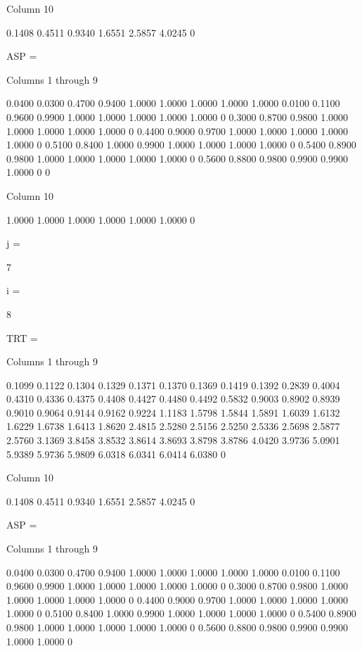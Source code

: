   Column 10

    0.1408
    0.4511
    0.9340
    1.6551
    2.5857
    4.0245
         0


ASP =

  Columns 1 through 9

    0.0400    0.0300    0.4700    0.9400    1.0000    1.0000    1.0000    1.0000    1.0000
    0.0100    0.1100    0.9600    0.9900    1.0000    1.0000    1.0000    1.0000    1.0000
         0    0.3000    0.8700    0.9800    1.0000    1.0000    1.0000    1.0000    1.0000
         0    0.4400    0.9000    0.9700    1.0000    1.0000    1.0000    1.0000    1.0000
         0    0.5100    0.8400    1.0000    0.9900    1.0000    1.0000    1.0000    1.0000
         0    0.5400    0.8900    0.9800    1.0000    1.0000    1.0000    1.0000    1.0000
         0    0.5600    0.8800    0.9800    0.9900    0.9900    1.0000         0         0

  Column 10

    1.0000
    1.0000
    1.0000
    1.0000
    1.0000
    1.0000
         0


j =

     7


i =

     8


TRT =

  Columns 1 through 9

    0.1099    0.1122    0.1304    0.1329    0.1371    0.1370    0.1369    0.1419    0.1392
    0.2839    0.4004    0.4310    0.4336    0.4375    0.4408    0.4427    0.4480    0.4492
    0.5832    0.9003    0.8902    0.8939    0.9010    0.9064    0.9144    0.9162    0.9224
    1.1183    1.5798    1.5844    1.5891    1.6039    1.6132    1.6229    1.6738    1.6413
    1.8620    2.4815    2.5280    2.5156    2.5250    2.5336    2.5698    2.5877    2.5760
    3.1369    3.8458    3.8532    3.8614    3.8693    3.8798    3.8786    4.0420    3.9736
    5.0901    5.9389    5.9736    5.9809    6.0318    6.0341    6.0414    6.0380         0

  Column 10

    0.1408
    0.4511
    0.9340
    1.6551
    2.5857
    4.0245
         0


ASP =

  Columns 1 through 9

    0.0400    0.0300    0.4700    0.9400    1.0000    1.0000    1.0000    1.0000    1.0000
    0.0100    0.1100    0.9600    0.9900    1.0000    1.0000    1.0000    1.0000    1.0000
         0    0.3000    0.8700    0.9800    1.0000    1.0000    1.0000    1.0000    1.0000
         0    0.4400    0.9000    0.9700    1.0000    1.0000    1.0000    1.0000    1.0000
         0    0.5100    0.8400    1.0000    0.9900    1.0000    1.0000    1.0000    1.0000
         0    0.5400    0.8900    0.9800    1.0000    1.0000    1.0000    1.0000    1.0000
         0    0.5600    0.8800    0.9800    0.9900    0.9900    1.0000    1.0000         0

